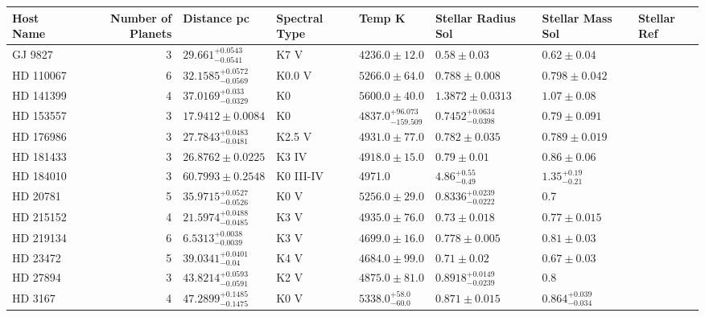 \begin{tabular}{lrllllll}
\toprule
Host Name & Number of Planets & Distance pc & Spectral Type & Temp K & Stellar Radius Sol & Stellar Mass Sol & Stellar Ref \\
\midrule
GJ 9827 & 3 & $29.661^{+0.0543}_{-0.0541}$ & K7 V & $4236.0 \pm 12.0$ & $0.58 \pm 0.03$ & $0.62 \pm 0.04$ & \cite{PASSEGGER_ET_AL_2024} \\
HD 110067 & 6 & $32.1585^{+0.0572}_{-0.0569}$ & K0.0 V & $5266.0 \pm 64.0$ & $0.788 \pm 0.008$ & $0.798 \pm 0.042$ & \cite{LUQUE_ET_AL__2023} \\
HD 141399 & 4 & $37.0169^{+0.033}_{-0.0329}$ & K0 & $5600.0 \pm 40.0$ & $1.3872 \pm 0.0313$ & $1.07 \pm 0.08$ & \cite{H_EACUTE_BRARD_ET_AL__2016} \\
HD 153557 & 3 & $17.9412 \pm 0.0084$ & K0 & $4837.0^{+96.073}_{-159.509}$ & $0.7452^{+0.0634}_{-0.0398}$ & $0.79 \pm 0.091$ & \cite{STASSUN_ET_AL__2019} \\
HD 176986 & 3 & $27.7843^{+0.0483}_{-0.0481}$ & K2.5 V & $4931.0 \pm 77.0$ & $0.782 \pm 0.035$ & $0.789 \pm 0.019$ & \cite{NARI_ET_AL_2026} \\
HD 181433 & 3 & $26.8762 \pm 0.0225$ & K3 IV & $4918.0 \pm 15.0$ & $0.79 \pm 0.01$ & $0.86 \pm 0.06$ & \cite{STASSUN_ET_AL__2017} \\
HD 184010 & 3 & $60.7993 \pm 0.2548$ & K0 III-IV & 4971.0 & $4.86^{+0.55}_{-0.49}$ & $1.35^{+0.19}_{-0.21}$ & \cite{TENG_ET_AL_2022} \\
HD 20781 & 5 & $35.9715^{+0.0527}_{-0.0526}$ & K0 V & $5256.0 \pm 29.0$ & $0.8336^{+0.0239}_{-0.0222}$ & 0.7 & \cite{UDRY_ET_AL__2019} \\
HD 215152 & 4 & $21.5974^{+0.0488}_{-0.0485}$ & K3 V & $4935.0 \pm 76.0$ & $0.73 \pm 0.018$ & $0.77 \pm 0.015$ & \cite{DELISLE_ET_AL__2018} \\
HD 219134 & 6 & $6.5313^{+0.0038}_{-0.0039}$ & K3 V & $4699.0 \pm 16.0$ & $0.778 \pm 0.005$ & $0.81 \pm 0.03$ & \cite{GILLON_ET_AL__2017} \\
HD 23472 & 5 & $39.0341^{+0.0401}_{-0.04}$ & K4 V & $4684.0 \pm 99.0$ & $0.71 \pm 0.02$ & $0.67 \pm 0.03$ & \cite{BARROS_ET_AL_2022} \\
HD 27894 & 3 & $43.8214^{+0.0593}_{-0.0591}$ & K2 V & $4875.0 \pm 81.0$ & $0.8918^{+0.0149}_{-0.0239}$ & 0.8 & \cite{MOUTOU_ET_AL__2005} \\
HD 3167 & 4 & $47.2899^{+0.1485}_{-0.1475}$ & K0 V & $5338.0^{+58.0}_{-60.0}$ & $0.871 \pm 0.015$ & $0.864^{+0.039}_{-0.034}$ & \cite{COY_ET_AL_2026} \\

\end{tabular}
